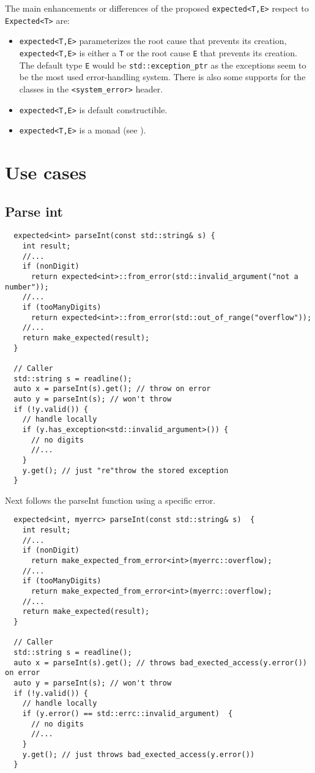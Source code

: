 \documentclass[a4paper,10pt]{article}
\newcommand{\cpp}[1]{\lstinline{#1}}
\begin{document}
\noindent
The main enhancements or differences of the proposed \cpp{expected<T,E>} respect to \cpp{Expected<T>} are:
\begin{itemize}
 \item \cpp{expected<T,E>} parameterizes the root cause that prevents its creation, \cpp{expected<T,E>} is either a \cpp{T} or the root cause \cpp{E} that prevents its creation. The default type \cpp{E} would be \cpp{std::exception_ptr} as the exceptions seem to be the most used error-handling system. There is also some supports for the classes in the \cpp{<system_error>} header.
 \item \cpp{expected<T,E>} is default constructible.
 \item \cpp{expected<T,E>} is a monad (see \cite{MONAD}).
\end{itemize}

\section{Use cases}

\subsection{Parse int}

\begin{lstlisting}
  expected<int> parseInt(const std::string& s) {
    int result;
    //...
    if (nonDigit)  
      return expected<int>::from_error(std::invalid_argument("not a number"));
    //...
    if (tooManyDigits) 
      return expected<int>::from_error(std::out_of_range("overflow"));
    //...
    return make_expected(result);
  }

  // Caller
  std::string s = readline();
  auto x = parseInt(s).get(); // throw on error
  auto y = parseInt(s); // won't throw
  if (!y.valid()) {
    // handle locally
    if (y.has_exception<std::invalid_argument>()) {
      // no digits
      //...
    }
    y.get(); // just "re"throw the stored exception
  }
\end{lstlisting}

Next follows the parseInt function using a specific error.

\begin{lstlisting}
  expected<int, myerrc> parseInt(const std::string& s)  {
    int result;
    //...
    if (nonDigit)  
      return make_expected_from_error<int>(myerrc::overflow);
    //...
    if (tooManyDigits)  
      return make_expected_from_error<int>(myerrc::overflow);
    //...
    return make_expected(result);
  }

  // Caller
  std::string s = readline();
  auto x = parseInt(s).get(); // throws bad_exected_access(y.error()) on error
  auto y = parseInt(s); // won't throw
  if (!y.valid()) {
    // handle locally
    if (y.error() == std::errc::invalid_argument)  {
      // no digits
      //...
    }
    y.get(); // just throws bad_exected_access(y.error())
  }
\end{lstlisting}
\end{document}
